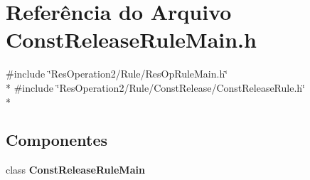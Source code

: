 \section{Referência do Arquivo Const\+Release\+Rule\+Main.\+h}
\label{_2_rule_2_const_release_2_const_release_rule_main_8h}
{\ttfamily \#include \char`\"{}Res\+Operation2/\+Rule/\+Res\+Op\+Rule\+Main.\+h\char`\"{}}\\*
{\ttfamily \#include \char`\"{}Res\+Operation2/\+Rule/\+Const\+Release/\+Const\+Release\+Rule.\+h\char`\"{}}\\*
\subsection*{Componentes}
\begin{DoxyCompactItemize}
\item 
class {\bf Const\+Release\+Rule\+Main}
\end{DoxyCompactItemize}
